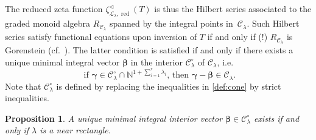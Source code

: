 \documentclass[11pt]{amsart}
\numberwithin{equation}{section}
\numberwithin{figure}{section}
\theoremstyle{plain}
\newtheorem{proposition}[theorem]{Proposition}
\theoremstyle{definition}
\theoremstyle{remark}
\begin{document}
The reduced zeta function $\zeta^{\triangleleft}_{{\ensuremath{\mathcal{L}}}_\lambda,\operatorname{red}}(T)$ is thus
the Hilbert series associated to the graded monoid algebra
$R_{{{\mathcal{C}}}_{\lambda}}$ spanned by the integral points
in~${{\mathcal{C}}}_{\lambda}$. Such Hilbert series satisfy functional equations
upon inversion of $T$ if and only if (!)  $R_{{{\mathcal{C}}}_{\lambda}}$ is
Gorenstein (cf.\ \cite[Theorem~12.7]{Stanley/96}). The latter
condition is satisfied if and only if there exists a unique minimal
integral vector ${\boldsymbol{\beta}}$ in the {interior} ${{\mathcal{C}}}_{\lambda}^{\circ}$
of ${{\mathcal{C}}}_{\lambda}$, i.e.\
\begin{equation}\label{equ:min.int}
\text{ if } \boldsymbol{\gamma}\in {{\mathcal{C}}}_{\lambda}^{\circ} \cap
{\ensuremath{\mathbb{N}}}^{1+\sum_{i=1}^r\lambda_i} \text{, then }\boldsymbol{\gamma} -
{\boldsymbol{\beta}}\in {{\mathcal{C}}}_{\lambda}.
\end{equation}
Note that ${{\mathcal{C}}}_{\lambda}^{\circ}$ is defined by replacing the
inequalities in \eqref{def:cone} by strict inequalities.
\begin{proposition}\label{prop:interior}
  A unique minimal integral interior vector
  ${\boldsymbol{\beta}}\in{{\mathcal{C}}}_{\lambda}^{\circ}$ exists if and only if $\lambda$
  is a near rectangle.
\end{proposition}
\end{document}
